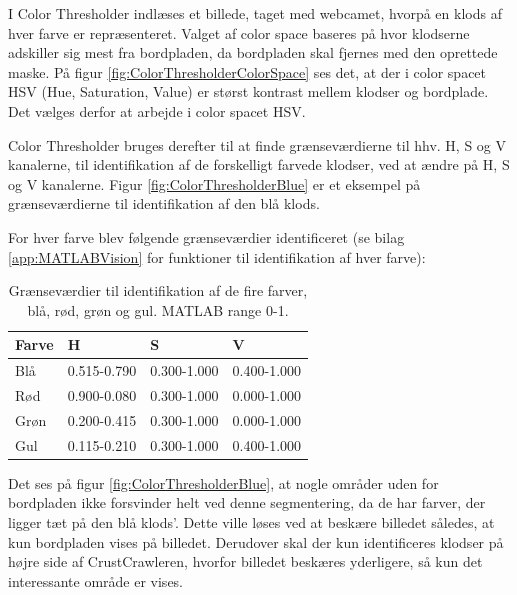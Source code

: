 I Color Thresholder indlæses et billede, taget med webcamet, hvorpå en klods af hver farve er repræsenteret.
Valget af color space baseres på hvor klodserne adskiller sig mest fra bordpladen, da bordpladen skal fjernes med den oprettede maske.
På figur \ref{fig:ColorThresholderColorSpace} ses det, at der i color spacet HSV (Hue, Saturation, Value) er størst kontrast mellem klodser og bordplade.
Det vælges derfor at arbejde i color spacet HSV.


Color Thresholder bruges derefter til at finde grænseværdierne til hhv. H, S og V kanalerne, til identifikation af de forskelligt farvede klodser, ved at ændre på H, S og V kanalerne.
Figur \vref{fig:ColorThresholderBlue} er et eksempel på grænseværdierne til identifikation af den blå klods.


For hver farve blev følgende grænseværdier identificeret (se bilag \vref{app:MATLABVision} for funktioner til identifikation af hver farve):
\begin{table}[H]
\centering
\begin{tabular}{l|l|l|l}
Farve	&	H			&	S			&	V\\
\hline
Blå		&	0.515-0.790	&	0.300-1.000	&	0.400-1.000\\
Rød		&	0.900-0.080	&	0.300-1.000	&	0.000-1.000\\
Grøn	&	0.200-0.415	&	0.300-1.000	&	0.000-1.000\\
Gul		&	0.115-0.210	&	0.300-1.000	&	0.400-1.000\\
\end{tabular}	
\caption{Grænseværdier til identifikation af de fire farver, blå, rød, grøn og gul. MATLAB range 0-1.}
\end{table}

Det ses på figur \vref{fig:ColorThresholderBlue}, at nogle områder uden for bordpladen ikke forsvinder helt ved denne segmentering, da de har farver, der ligger tæt på den blå klods'.
Dette ville løses ved at beskære billedet således, at kun bordpladen vises på billedet.
Derudover skal der kun identificeres klodser på højre side af CrustCrawleren, hvorfor billedet beskæres yderligere, så kun det interessante område er vises.

